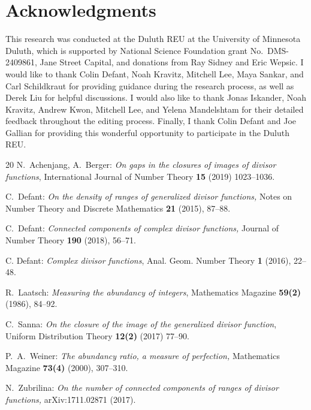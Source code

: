 \documentclass[12pt]{amsart}
\theoremstyle{definition}
\numberwithin{equation}{section}
\begin{document}
\section{Acknowledgments}

This research was conducted at the Duluth REU at the University of Minnesota Duluth, which is supported by National Science Foundation grant No.~DMS-2409861, Jane
Street Capital, and donations from Ray Sidney and Eric Wepsic. I would like
to thank Colin Defant, Noah Kravitz, Mitchell Lee, Maya Sankar, and Carl Schildkraut for providing guidance during the research process, as well as Derek Liu for helpful discussions. I would also like to thank Jonas Iskander, Noah Kravitz, Andrew Kwon, Mitchell Lee, and Yelena Mandelshtam for their detailed feedback throughout the editing process. Finally, I thank Colin
Defant and Joe Gallian for providing this wonderful opportunity to participate in the Duluth REU. 

	
\begin{thebibliography}{20}
         N.~Achenjang, A.~Berger: \emph{On gaps in the closures of images of divisor functions}, International Journal of Number Theory \textbf{15} (2019) 1023--1036.
        
         C.~Defant: \textit{On the density of ranges of generalized divisor functions,} Notes on Number Theory and Discrete Mathematics \textbf{21} (2015), 87--88.

         C.~Defant: \textit{Connected components of complex divisor functions,} Journal of Number Theory \textbf{190} (2018), 56--71.

         C. Defant: \textit{Complex divisor functions}, Anal. Geom. Number Theory \textbf{1} (2016), 22--48.

         R.~Laatsch: \textit{Measuring the abundancy of integers}, Mathematics Magazine \textbf{59(2)} (1986), 84--92.
		
		 C.~Sanna: \emph{On the closure of the image of the generalized divisor function}, Uniform Distribution Theory \textbf{12(2)} (2017) 77--90.

        

         P.~A.~Weiner: \textit{The abundancy ratio, a measure of perfection,} Mathematics Magazine \textbf{73(4)} (2000), 307--310.

         N.~Zubrilina: \textit{On the number of connected components of ranges of divisor functions,} arXiv:1711.02871 (2017).
	\end{thebibliography}
\end{document}
